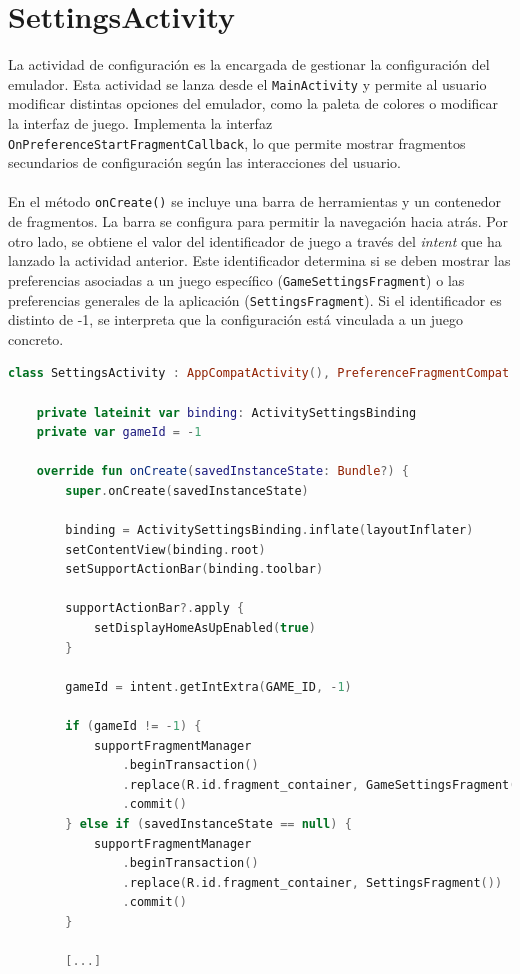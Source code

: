 \section{SettingsActivity}
La actividad de configuración es la encargada de gestionar la configuración del emulador. Esta actividad se lanza desde el \texttt{MainActivity} y permite al usuario modificar distintas opciones del emulador, como la paleta de colores o modificar la interfaz de juego. Implementa la interfaz \texttt{OnPreferenceStartFragmentCallback}, lo que permite mostrar fragmentos secundarios de configuración según las interacciones del usuario.
\\\\
En el método \texttt{onCreate()} se incluye una barra de herramientas y un contenedor de fragmentos. La barra se configura para permitir la navegación hacia atrás. Por otro lado, se obtiene el valor del identificador de juego a través del \textit{intent} que ha lanzado la actividad anterior. Este identificador determina si se deben mostrar las preferencias asociadas a un juego específico (\texttt{GameSettingsFragment}) o las preferencias generales de la aplicación (\texttt{SettingsFragment}). Si el identificador es distinto de -1, se interpreta que la configuración está vinculada a un juego concreto.

\begin{lstlisting}[language=Kotlin, caption={SettingsActivity - Inicialización.}, label={code:settingsActivityInit}]
    class SettingsActivity : AppCompatActivity(), PreferenceFragmentCompat.OnPreferenceStartFragmentCallback {

    private lateinit var binding: ActivitySettingsBinding
    private var gameId = -1

    override fun onCreate(savedInstanceState: Bundle?) {
        super.onCreate(savedInstanceState)

        binding = ActivitySettingsBinding.inflate(layoutInflater)
        setContentView(binding.root)
        setSupportActionBar(binding.toolbar)

        supportActionBar?.apply {
            setDisplayHomeAsUpEnabled(true)
        }

        gameId = intent.getIntExtra(GAME_ID, -1)

        if (gameId != -1) {
            supportFragmentManager
                .beginTransaction()
                .replace(R.id.fragment_container, GameSettingsFragment(gameId))
                .commit()
        } else if (savedInstanceState == null) {
            supportFragmentManager
                .beginTransaction()
                .replace(R.id.fragment_container, SettingsFragment())
                .commit()
        }

        [...]
\end{lstlisting}

